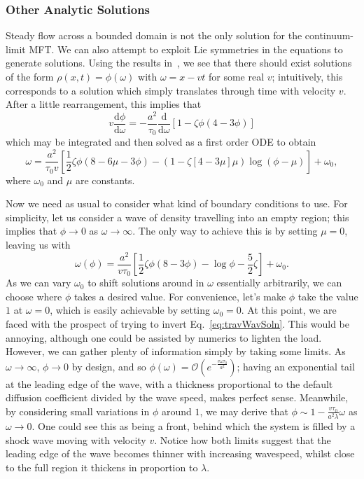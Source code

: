 \subsubsection{Other Analytic Solutions}
Steady flow across a bounded domain is not the only solution for the continuum-limit MFT. We can also attempt to exploit Lie symmetries in the equations to generate solutions. Using the results in~\cite{ivanova2007},
we see that there should exist solutions of the form $\rho(x, t) = \phi(\omega)$ with $\omega = x-vt$ for some real $v$; intuitively, this corresponds to a solution which simply translates through time with velocity $v$.
After a little rearrangement, this implies that
\begin{equation}
 v \frac{\mathrm{d}\phi}{\mathrm{d}\omega} = -\frac{a^2}{\tau_0} \frac{\mathrm{d}}{\mathrm{d}\omega}\left[ 1-\zeta \phi \left(4-3\phi\right) \right]
\end{equation}
which may be integrated and then solved as a first order ODE to obtain
\begin{equation}
 \omega = \frac{a^2}{\tau_0 v} \left[ \frac{1}{2} \zeta \phi \left(8-6\mu-3\phi\right) - \left(1-\zeta\left[4-3\mu\right]\mu\right) \log{\left(\phi-\mu\right)} \right] + \omega_0,
\end{equation}
where $\omega_0$ and $\mu$ are constants.

Now we need as usual to consider what kind of boundary conditions to use. For simplicity, let us consider a wave of density travelling into an empty region; this implies that $\phi \rightarrow 0$ as $\omega \rightarrow \infty$.
The only way to achieve this is by setting $\mu=0$, leaving us with
\begin{equation}
\label{eq:travWavSoln}
 \omega(\phi) = \frac{a^2}{v\tau_0} \left[ \frac{1}{2}\zeta \phi(8-3\phi) - \log{\phi} - \frac{5}{2}\zeta \right] + \omega_0.
\end{equation}
As we can vary $\omega_0$ to shift solutions around in $\omega$ essentially arbitrarily, we can choose where $\phi$ takes a desired value. For convenience, let's make $\phi$ take the value $1$ at $\omega=0$, which is easily
achievable by setting $\omega_0 = 0$. At this point, we are faced with the prospect of trying to invert Eq.~\eqref{eq:travWavSoln}. This would be annoying, although one could be assisted by numerics to lighten the load.
However, we can gather plenty of information simply by taking some limits. As $\omega \rightarrow \infty$, $\phi \rightarrow 0$ by design, and so $\phi(\omega) = \mathcal{O}(e^{-\frac{v\omega\tau_0}{a^2}})$; having an
exponential tail at the leading edge of the wave, with a thickness proportional to the default diffusion coefficient divided by the wave speed, makes perfect sense. Meanwhile, by considering small variations in $\phi$ around $1$,
we may derive that $\phi \sim 1-\frac{v \tau_0}{a^2 \lambda} \omega$ as $\omega \rightarrow 0$. One could see this as being a front, behind which the system is filled by a shock wave moving with velocity $v$. Notice how both
limits suggest that the leading edge of the wave becomes thinner with increasing wavespeed, whilst close to the full region it thickens in proportion to $\lambda$.

